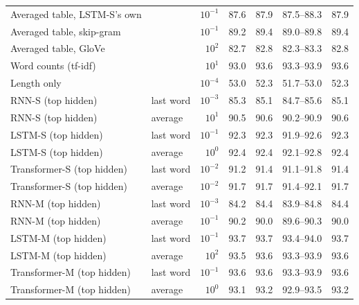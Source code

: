 \begin{tabular}{@{}llrrrrr@{}}
Averaged table, LSTM-S's own &  & $10^{-1}$ & 87.6 & 87.9 & 87.5--88.3 & 87.9 \\
Averaged table, skip-gram &  & $10^{-1}$ & 89.2 & 89.4 & 89.0--89.8 & 89.4 \\
Averaged table, GloVe &  & $10^{2}$ & 82.7 & 82.8 & 82.3--83.3 & 82.8 \\
Word counts (tf-idf) &  & $10^{1}$ & 93.0 & 93.6 & 93.3--93.9 & 93.6 \\
Length only &  & $10^{-4}$ & 53.0 & 52.3 & 51.7--53.0 & 52.3 \\
RNN-S (top hidden) & last word & $10^{-3}$ & 85.3 & 85.1 & 84.7--85.6 & 85.1 \\
RNN-S (top hidden) & average & $10^{1}$ & 90.5 & 90.6 & 90.2--90.9 & 90.6 \\
LSTM-S (top hidden) & last word & $10^{-1}$ & 92.3 & 92.3 & 91.9--92.6 & 92.3 \\
LSTM-S (top hidden) & average & $10^{0}$ & 92.4 & 92.4 & 92.1--92.8 & 92.4 \\
Transformer-S (top hidden) & last word & $10^{-2}$ & 91.2 & 91.4 & 91.1--91.8 & 91.4 \\
Transformer-S (top hidden) & average & $10^{-2}$ & 91.7 & 91.7 & 91.4--92.1 & 91.7 \\
RNN-M (top hidden) & last word & $10^{-3}$ & 84.2 & 84.4 & 83.9--84.8 & 84.4 \\
RNN-M (top hidden) & average & $10^{-1}$ & 90.2 & 90.0 & 89.6--90.3 & 90.0 \\
LSTM-M (top hidden) & last word & $10^{-1}$ & 93.7 & 93.7 & 93.4--94.0 & 93.7 \\
LSTM-M (top hidden) & average & $10^{2}$ & 93.5 & 93.6 & 93.3--93.9 & 93.6 \\
Transformer-M (top hidden) & last word & $10^{-1}$ & 93.6 & 93.6 & 93.3--93.9 & 93.6 \\
Transformer-M (top hidden) & average & $10^{0}$ & 93.1 & 93.2 & 92.9--93.5 & 93.2 \\
\bottomrule
\end{tabular}
